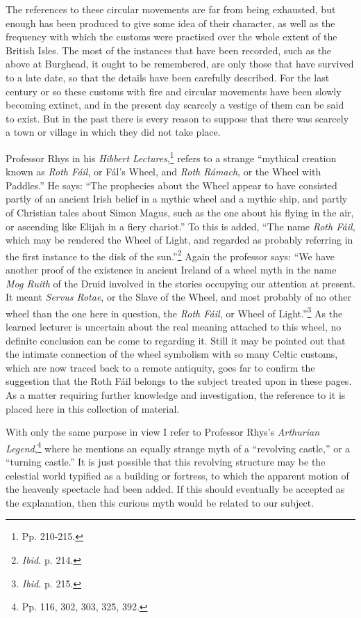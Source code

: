 \documentclass[a4paper, 11pt, oneside, polutonikogreek, english]{article}
\begin{document}
The references to these circular movements are far from being exhausted, but enough has been produced to give some idea of their character, as well as the frequency with which the customs were practised over the whole extent of the British Isles. The most of the instances that have been recorded, such as the above at Burghead, it ought to be remembered, are only those that have survived to a late date, so that the details have been carefully described. For the last century or so these customs with fire and circular movements have been slowly becoming extinct, and in the present day scarcely a vestige of them can be said to exist. But in the past there is every reason to suppose that there was scarcely a town or village in which they did not take place.

Professor Rhys in his \emph{Hibbert Lectures},\footnote{Pp. 210-215.} refers to a strange ``mythical creation known as \emph{Roth Fáil}, or Fál's Wheel, and \emph{Roth Rámach}, or the Wheel with Paddles.'' He says: ``The prophecies about the Wheel appear to have consisted partly of an ancient Irish belief in a mythic wheel and a mythic ship, and partly of Christian tales about Simon Magus, such as the one about his flying in the air, or ascending like Elijah in a fiery chariot.'' To this is added, ``The name \emph{Roth Fáil}, which may be rendered the Wheel of Light, and regarded as probably referring in the first instance to the disk of the sun.''\footnote{\emph{Ibid.} p. 214.} Again the professor says: ``We have another proof of the existence in ancient Ireland of a wheel myth in the name \emph{Mog Ruith} of the Druid involved in the stories occupying our attention at present. It meant \emph{Servus Rotae}, or the Slave of the Wheel, and most probably of no other wheel than the one here in question, the \emph{Roth Fáil}, or Wheel of Light.''\footnote{\emph{Ibid.} p. 215.} As the learned lecturer is uncertain about the real meaning attached to this wheel, no definite conclusion can be come to regarding it. Still it may be pointed out that the intimate connection of the wheel symbolism with so many Celtic customs, which are now traced back to a remote antiquity, goes far to confirm the suggestion that the Roth Fáil belongs to the subject treated upon in these pages. As a matter requiring further knowledge and investigation, the reference to it is placed here in this collection of material.

With only the same purpose in view I refer to Professor Rhys's \emph{Arthurian Legend},\footnote{Pp. 116, 302, 303, 325, 392.} where he mentions an equally strange myth of a ``revolving castle,'' or a ``turning castle.'' It is just possible that this revolving structure may be the celestial world typified as a building or fortress, to which the apparent motion of the heavenly spectacle had been added. If this should eventually be accepted as the explanation, then this curious myth would be related to our subject.
\end{document}
